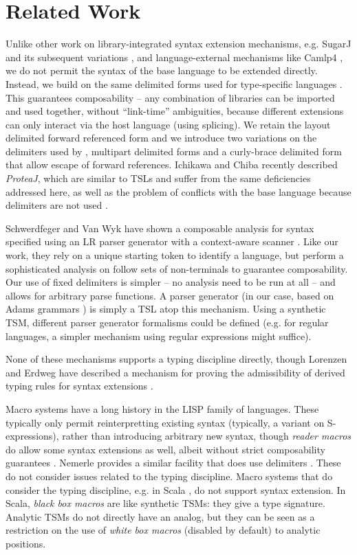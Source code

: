 \documentclass{sig-alternate}
\begin{document}
\section{Related Work}\label{related}
Unlike other work on library-integrated syntax extension mechanisms, e.g. SugarJ and its subsequent variations \cite{erdweg2013framework}, and language-external mechanisms like Camlp4 \cite{ocaml-manual}, we do not permit the syntax of the base language to be extended directly. Instead, we build on the same delimited forms used for type-specific languages \cite{TSLs}. This guarantees composability -- any combination of  libraries can be imported and used together, without ``link-time'' ambiguities, because different extensions can only interact via the host language (using splicing). We retain the layout delimited forward referenced form and we introduce two variations on the delimiters used by \cite{TSLs}, multipart delimited forms and a curly-brace delimited form that allow escape of forward references. Ichikawa and Chiba recently described \emph{ProteaJ}, which are similar to TSLs and suffer from the same deficiencies addressed here, as well as the problem of conflicts with the base language because delimiters are not used \cite{Ichikawa:2014:CUO:2577080.2577092}.

Schwerdfeger and Van Wyk have shown a composable analysis for syntax specified using an LR parser generator with a context-aware scanner \cite{conf/pldi/SchwerdfegerW09}. Like our work, they rely on a unique starting token to identify a language, but perform a sophisticated analysis on follow sets of non-terminals to guarantee composability. Our use of fixed delimiters is simpler -- no analysis need to be run at all -- and allows for arbitrary parse functions. A parser generator (in our case, based on Adams grammars \cite{Adams:2013:PPI:2429069.2429129}) is simply a TSL atop this mechanism. Using a synthetic TSM, different parser generator formalisms could be defined (e.g. for regular languages, a simpler mechanism using regular expressions might suffice).

None of these mechanisms supports a typing discipline directly, though Lorenzen and Erdweg have described a mechanism for proving the admissibility of derived typing rules for syntax extensions \cite{conf/icfp/LorenzenE13}.  

Macro systems have a long history in the LISP family of languages. These typically only permit reinterpretting existing syntax (typically, a variant on S-expressions), rather than introducing arbitrary new syntax, though \emph{reader macros} do allow some syntax extensions as well, albeit without strict composability guarantees \cite{steele1990common}. Nemerle provides a similar facility that does use delimiters \cite{skalski2004meta}. These do not consider issues related to the typing discipline. Macro systems that do consider the typing discipline, e.g. in Scala \cite{ScalaMacros2013}, do not support syntax extension. In Scala, \emph{black box macros} are like synthetic TSMs: they give a type signature. Analytic TSMs do not directly have an analog, but they can be seen as a restriction on the use of \emph{white box macros} (disabled by default) to analytic positions. 
\end{document}
